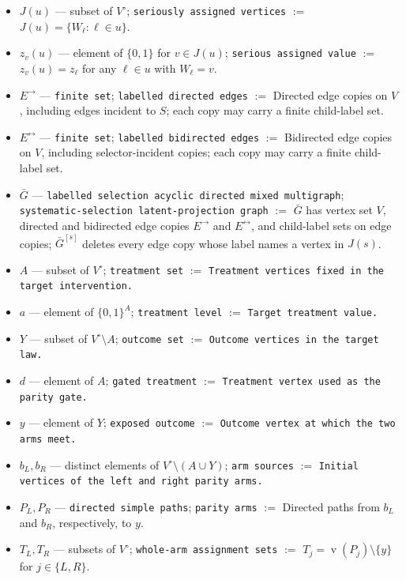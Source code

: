 \documentclass{article}
\begin{document}
\begin{itemize}
  \item \(J(u)\) --- subset of \(V^\circ\); \texttt{seriously assigned vertices} $:=$ \(J(u)=\{W_\ell:\ell\in u\}\).
  \item \(z_v(u)\) --- element of \(\{0,1\}\) for \(v\in J(u)\); \texttt{serious assigned value} $:=$ \(z_v(u)=z_\ell\) for any \(\ell\in u\) with \(W_\ell=v\).
  \item \(E^{\to}\) --- \texttt{finite set}; \texttt{labelled directed edges} $:=$ Directed edge copies on \(V\), including edges incident to \(S\); each copy may carry a finite child-label set.
  \item \(E^{\leftrightarrow}\) --- \texttt{finite set}; \texttt{labelled bidirected edges} $:=$ Bidirected edge copies on \(V\), including selector-incident copies; each copy may carry a finite child-label set.
  \item \(\bar G\) --- \texttt{labelled selection acyclic directed mixed multigraph}; \texttt{systematic-selection latent-projection graph} $:=$ \(\bar G\) has vertex set \(V\), directed and bidirected edge copies \(E^{\to}\) and \(E^{\leftrightarrow}\), and child-label sets on edge copies; \(\bar G^{[s]}\) deletes every edge copy whose label names a vertex in \(J(s)\).
  \item \(A\) --- subset of \(V^\circ\); \texttt{treatment set} $:=$ \texttt{Treatment vertices fixed in the target intervention.}
  \item \(a\) --- element of \(\{0,1\}^{A}\); \texttt{treatment level} $:=$ \texttt{Target treatment value.}
  \item \(Y\) --- subset of \(V^\circ\setminus A\); \texttt{outcome set} $:=$ \texttt{Outcome vertices in the target law.}
  \item \(d\) --- element of \(A\); \texttt{gated treatment} $:=$ \texttt{Treatment vertex used as the parity gate.}
  \item \(y\) --- element of \(Y\); \texttt{exposed outcome} $:=$ \texttt{Outcome vertex at which the two arms meet.}
  \item \(b_L,b_R\) --- distinct elements of \(V^\circ\setminus(A\cup Y)\); \texttt{arm sources} $:=$ \texttt{Initial vertices of the left and right parity arms.}
  \item \(P_L,P_R\) --- \texttt{directed simple paths}; \texttt{parity arms} $:=$ Directed paths from \(b_L\) and \(b_R\), respectively, to \(y\).
  \item \(T_L,T_R\) --- subsets of \(V^\circ\); \texttt{whole-arm assignment sets} $:=$ \(T_j=\operatorname{v}(P_j)\setminus\{y\}\) for \(j\in\{L,R\}\).

\end{itemize}
\end{document}
